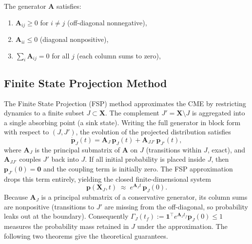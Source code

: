 \documentclass[onefignum,onetabnum]{siamart171218}
\begin{document}
\begin{remark}
The generator $\mathbf{A}$ satisfies:  
\begin{enumerate}
    \item $\mathbf{A}_{ij}\ge 0$ for $i\neq j$ (off-diagonal nonnegative),
    \item $\mathbf{A}_{ii}\le 0$ (diagonal nonpositive),
    \item $\sum_{i} \mathbf{A}_{ij}=0$ for all $j$ (each column sums to zero),
\end{enumerate}
\end{remark}

\subsection{Finite State Projection Method}

The Finite State Projection (FSP) method \cite{Munsky2006} approximates the CME by restricting dynamics to a finite subset $J \subset \mathbf{X}$. The complement $J' = \mathbf{X} \setminus J$ is aggregated into a single absorbing point (a sink state). Writing the full generator in block form with respect to $(J, J')$, the evolution of the projected distribution satisfies
\begin{equation}
    \dot{\boldsymbol{p}}_J(t) = \mathbf{A}_J\,\boldsymbol{p}_J(t) + \mathbf{A}_{JJ'}\,\boldsymbol{p}_{J'}(t),
    \label{eq:fsp-exact}
\end{equation}
where $\mathbf{A}_J$ is the principal submatrix of $\mathbf{A}$ on $J$ (transitions within $J$, exact), and $\mathbf{A}_{JJ'}$ couples $J'$ back into $J$. If all initial probability is placed inside $J$, then $\boldsymbol{p}_{J'}(0) = \mathbf{0}$ and the coupling term is initially zero. The FSP approximation drops this term entirely, yielding the closed finite-dimensional system
\begin{equation}
    \boldsymbol{p}(\mathbf{X}_J, t) \;\approx\; e^{\mathbf{A}_J t}\, \boldsymbol{p}_J(0).
    \label{eq:fsp-approx}
\end{equation}
Because $\mathbf{A}_J$ is a principal submatrix of a conservative generator, its column sums are nonpositive (transitions to $J'$ are missing from the off-diagonal, so probability leaks out at the boundary). Consequently $\Gamma_J(t_f) := \mathbf{1}^\top e^{\mathbf{A}_J t_f}\boldsymbol{p}_J(0) \le 1$ measures the probability mass retained in $J$ under the approximation. The following two theorems \cite{Munsky2006} give the theoretical guarantees.
\end{document}
